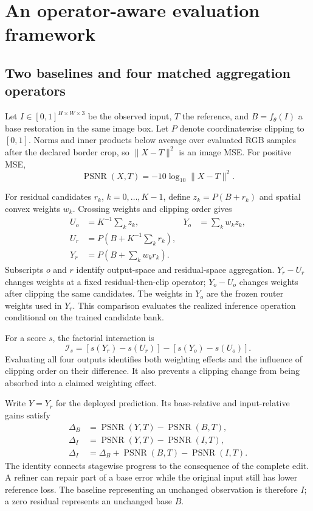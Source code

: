 \documentclass[12pt]{article}
\newcommand{\PSNR}{\operatorname{PSNR}}
\begin{document}
\section{An operator-aware evaluation framework}
\label{sec:framework}
\subsection{Two baselines and four matched aggregation operators}
Let $I\in[0,1]^{H\times W\times3}$ be the observed input, $T$ the reference, and $B=f_\theta(I)$ a base restoration in the same image box. Let $P$ denote coordinatewise clipping to $[0,1]$. Norms and inner products below average over evaluated RGB samples after the declared border crop, so $\|X-T\|^2$ is an image MSE. For positive MSE,
\begin{equation}
\PSNR(X,T)=-10\log_{10}\|X-T\|^2.
\end{equation}

For residual candidates $r_k$, $k=0,\ldots,K-1$, define $z_k=P(B+r_k)$ and spatial convex weights $w_k$. Crossing weights and clipping order gives
\begin{align}
U_o &= K^{-1}\sum_k z_k, &
Y_o &= \sum_k w_k z_k, \label{eq:uniform-output}\\
U_r &= P\!\left(B+K^{-1}\sum_k r_k\right), \label{eq:uniform-residual}\\
Y_r &= P\!\left(B+\sum_k w_k r_k\right). \label{eq:routed}
\end{align}
Subscripts $o$ and $r$ identify output-space and residual-space aggregation. $Y_r-U_r$ changes weights at a fixed residual-then-clip operator; $Y_o-U_o$ changes weights after clipping the same candidates. The weights in $Y_o$ are the frozen router weights used in $Y_r$. This comparison evaluates the realized inference operation conditional on the trained candidate bank.

For a score $s$, the factorial interaction is
\begin{equation}
\mathcal I_s=[s(Y_r)-s(U_r)]-[s(Y_o)-s(U_o)]. \label{eq:interaction}
\end{equation}
Evaluating all four outputs identifies both weighting effects and the influence of clipping order on their difference. It also prevents a clipping change from being absorbed into a claimed weighting effect.

Write $Y=Y_r$ for the deployed prediction. Its base-relative and input-relative gains satisfy
\begin{align}
\Delta_B &= \PSNR(Y,T)-\PSNR(B,T),\\
\Delta_I &= \PSNR(Y,T)-\PSNR(I,T),\\
\Delta_I &= \Delta_B+\PSNR(B,T)-\PSNR(I,T). \label{eq:two-baselines}
\end{align}
The identity connects stagewise progress to the consequence of the complete edit. A refiner can repair part of a base error while the original input still has lower reference loss. The baseline representing an unchanged observation is therefore $I$; a zero residual represents an unchanged base $B$.
\end{document}

